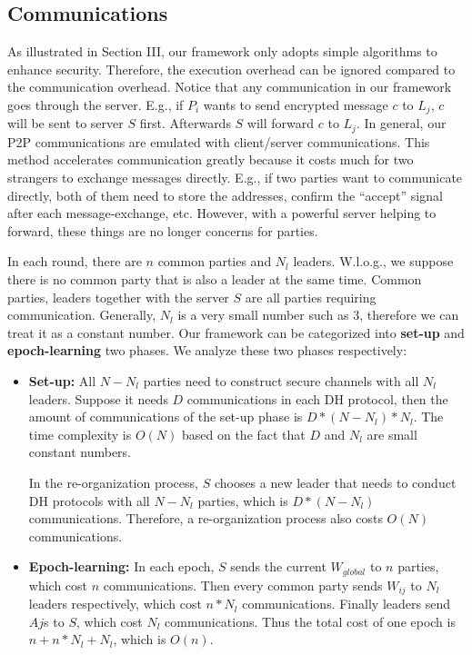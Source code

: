 \subsection{Communications}
As illustrated in Section III, our framework only adopts simple algorithms to enhance security. Therefore, the execution overhead can be ignored compared to the communication overhead. Notice that any communication in our framework goes through the server. E.g., if $P_i$ wants to send encrypted message $c$ to $L_j$, $c$ will be sent to server $S$ first. Afterwards $S$ will forward $c$ to $L_j$. In general, our P2P communications are emulated with client/server communications. This method accelerates communication greatly because it costs much for two strangers to exchange messages directly. E.g., if two parties want to communicate directly, both of them need to store the addresses, confirm the ``accept'' signal after each message-exchange, etc. However, with a powerful server helping to forward, these things are no longer concerns for parties.

In each round, there are $n$ common parties and $N_l$ leaders. W.l.o.g., we suppose there is no common party that is also a leader at the same time. Common parties, leaders together with the server $S$ are all parties requiring communication. Generally, $N_l$ is a very small number such as 3, therefore we can treat it as a constant number. Our framework can be categorized into \textbf{set-up} and \textbf{epoch-learning} two phases. We analyze these two phases respectively:

\begin{itemize}
    \item \textbf{Set-up:} All $N-N_l$ parties need to construct secure channels with all $N_l$ leaders. Suppose it needs $D$ communications in each DH protocol, then the amount of communications of the set-up phase is $D * (N-N_l) * N_l$. The time complexity is $O(N)$ based on the fact that $D$ and $N_l$ are small constant numbers.
    
    In the re-organization process, $S$ chooses a new leader that needs to conduct DH protocols with all $N-N_l$ parties, which is $D * (N-N_l)$ communications. Therefore, a re-organization process also costs $O(N)$ communications.
    
    \item \textbf{Epoch-learning:} In each epoch, $S$ sends the current $W_{global}$ to $n$ parties, which cost $n$ communications. Then every common party sends $W_{ij}$ to $N_l$ leaders respectively, which cost $n * N_l$ communications. Finally leaders send $Aj$s to $S$, which cost $N_l$ communications. Thus the total cost of one epoch is $n + n * N_l + N_l$, which is $O(n)$.
\end{itemize}

